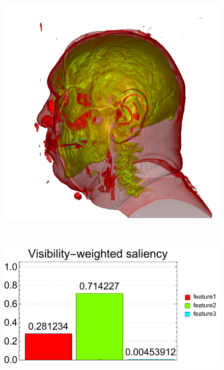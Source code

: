 \begin{figure}
\begin{minipage}{.24\textwidth}
		\includegraphics[width=1\linewidth]{images/vismale_naive}
		\subcaption{}
	\end{minipage}~
	\begin{minipage}{.25\textwidth}
		\includegraphics[width=1\linewidth]{figures/vismale_naive_visibility_saliency_weighted_chart}
		\subcaption{}
	\end{minipage}
	\begin{minipage}{.24\textwidth}

\end{minipage}
\end{figure}
